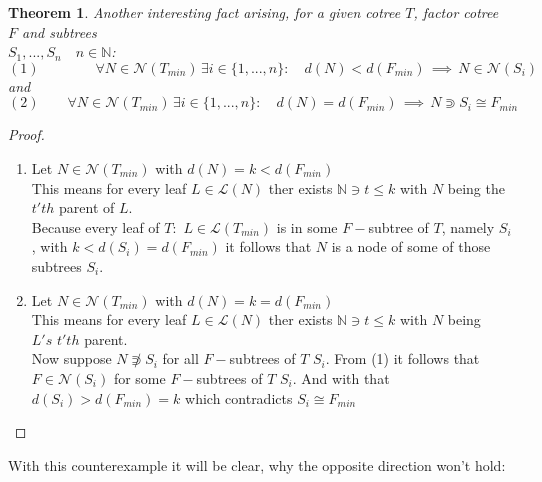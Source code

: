 \documentclass[a4paper,12pt]{article}
\newtheorem{theorem}{Theorem}[section]
\theoremstyle{definition}
\begin{document}
	\begin{theorem}
	Another interesting fact arising, for a given cotree $T$, factor cotree $F$ and subtrees\\ $S_1,...,S_n\quad n\in\mathds{N}$:
	\[(1)\qquad\qquad\forall N\in \mathcal{N}(T_{min})\, \exists i\in\{1,...,n\}:\quad d(N)< d(F_{min})\,\implies\, N\in \mathcal{N}(S_i) \]
	and  
	\[(2)\qquad \forall N\in \mathcal{N}(T_{min})\, \exists i\in\{1,...,n\}:\quad d(N)= d(F_{min})\,\implies\, N\Supset S_i\cong F_{min} \]
	\end{theorem}
	\begin{proof}
		\begin{enumerate}[(1)]
			\item Let $N\in \mathcal{N}(T_{min})$ with $d(N)= k< d(F_{min})$\\
			This means for every leaf $L\in \mathcal{L}(N)$ ther exists $\mathds{N}\ni t\leq k$ with $N$ being the $ t'th$ parent of $L$.\\
			Because every leaf of $T$: $\, L\in \mathcal{L}(T_{min})$ is in some $F-$subtree of $T$, namely $S_i$, with $k < d(S_i)=d(F_{min})$ it follows that $N$ is a node of some of those subtrees $S_i$.
			\item  Let $N\in \mathcal{N}(T_{min})$ with $d(N)= k=d(F_{min})$\\
			This means for every leaf $L\in \mathcal{L}(N)$ ther exists $\mathds{N}\ni t\leq k$ with $N$ being $L's\,\, t'th$ parent.\\
			Now suppose $N\not \Supset S_i$ for all $F-$subtrees of $T$ $S_i$.
			From (1) it follows that $F\in \mathcal{N}(S_i)$ for some $F-$subtrees of $T$ $S_i$. And with that $d(S_i)>d(F_{min})=k$ which contradicts $S_i\cong F_{min}$
		\end{enumerate}
	\end{proof}
	With this counterexample it will be clear, why the opposite direction won't hold:
	\begin{center}
	\end{center}
\end{document}
